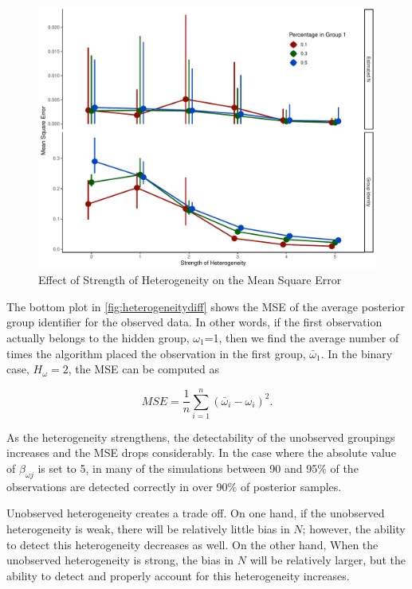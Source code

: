 \documentclass[
  12pt,
]{article}
\begin{document}
\begin{figure}[H]

{\centering \includegraphics{dissertationmain_files/figure-latex/heterogeneitydiff-1} 

}

\caption{\label{fig:strengthheterogeneitydiff}Effect of Strength of Heterogeneity on the Mean Square Error}\label{fig:heterogeneitydiff}
\end{figure}

The bottom plot in \autoref{fig:heterogeneitydiff} shows the MSE of the
average posterior group identifier for the observed data. In other
words, if the first observation actually belongs to the hidden group,
\(\omega_1\)=1, then we find the average number of times the algorithm
placed the observation in the first group, \(\bar{\omega}_1\). In the
binary case, \(H_\omega=2\), the MSE can be computed as

\begin{equation}
MSE = \frac{1}{n}\sum_{i=1}^n (\bar{\omega}_{i} - \omega_i)^2.
\end{equation}

As the heterogeneity strengthens, the detectability of the unobserved
groupings increases and the MSE drops considerably. In the case where
the absolute value of \(\beta_{\omega j}\) is set to 5, in many of the
simulations between 90 and 95\(\%\) of the observations are detected
correctly in over 90\(\%\) of posterior samples.

Unobserved heterogeneity creates a trade off. On one hand, if the
unobserved heterogeneity is weak, there will be relatively little bias
in \(N\); however, the ability to detect this heterogeneity decreases as
well. On the other hand, When the unobserved heterogeneity is strong,
the bias in \(N\) will be relatively larger, but the ability to detect
and properly account for this heterogeneity increases.
\end{document}
